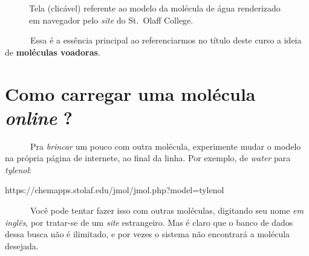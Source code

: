 \documentclass[
  letterpaper,
  DIV=11,
  numbers=noendperiod]{scrreprt}
\newenvironment{Shaded}{\begin{snugshade}}{\end{snugshade}}
\newcommand{\ErrorTok}[1]{\textcolor[rgb]{0.68,0.00,0.00}{#1}}
\newcommand{\NormalTok}[1]{\textcolor[rgb]{0.00,0.23,0.31}{#1}}
\newcommand{\OtherTok}[1]{\textcolor[rgb]{0.00,0.23,0.31}{#1}}
\newcommand{\SpecialCharTok}[1]{\textcolor[rgb]{0.37,0.37,0.37}{#1}}
\begin{document}
\begin{figure}


\caption{\label{fig-telaInicio}Tela (clicável) referente ao modelo da
molécula de água renderizado em navegador pelo \emph{site} do St.~Olaff
College.}

\end{figure}%

~~~~~~Essa é a essência principal ao referenciarmos no título deste
curso a ideia de \textbf{moléculas voadoras}.

\section{\texorpdfstring{Como carregar uma molécula \emph{online}
?}{Como carregar uma molécula online ?}}\label{como-carregar-uma-moluxe9cula-online}

~~~~~~Pra \emph{brincar} um pouco com outra molécula, experimente mudar
o modelo na própria página de internete, ao final da linha. Por exemplo,
de \emph{water} para \emph{tylenol}:

\begin{Shaded}
\begin{Highlighting}[]
\NormalTok{https}\SpecialCharTok{:}\ErrorTok{//}\NormalTok{chemapps.stolaf.edu}\SpecialCharTok{/}\NormalTok{jmol}\SpecialCharTok{/}\NormalTok{jmol.php?model}\OtherTok{=}\NormalTok{tylenol}
\end{Highlighting}
\end{Shaded}

~~~~~~Você pode tentar fazer isso com outras moléculas, digitando seu
nome \emph{em inglês}, por tratar-se de um \emph{site} estrangeiro. Mas
é claro que o banco de dados dessa busca não é ilimitado, e por vezes o
sistema não encontrará a molécula desejada.
\end{document}
